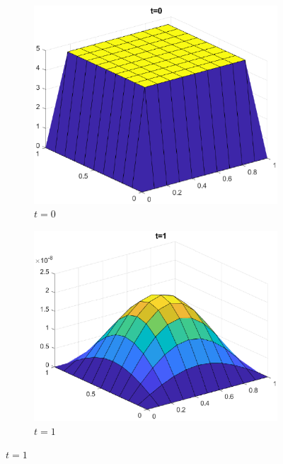 \documentclass[]{article}
\begin{document}
	\begin{figure}[htbp]
		\centering
		
		\begin{subfigure}[b]{0.45\textwidth}
			\includegraphics[width=\textwidth]{images/h2_t0.eps}
			\caption{$t = 0$}
			\label{fig:image1}
		\end{subfigure}
		\hfill
		\begin{subfigure}[b]{0.45\textwidth}
			\includegraphics[width=\textwidth]{images/h2_t1.eps}
			\caption{$t = 1$}
			\label{fig:image2}
		\end{subfigure}
		
	\end{figure}
\end{document}
